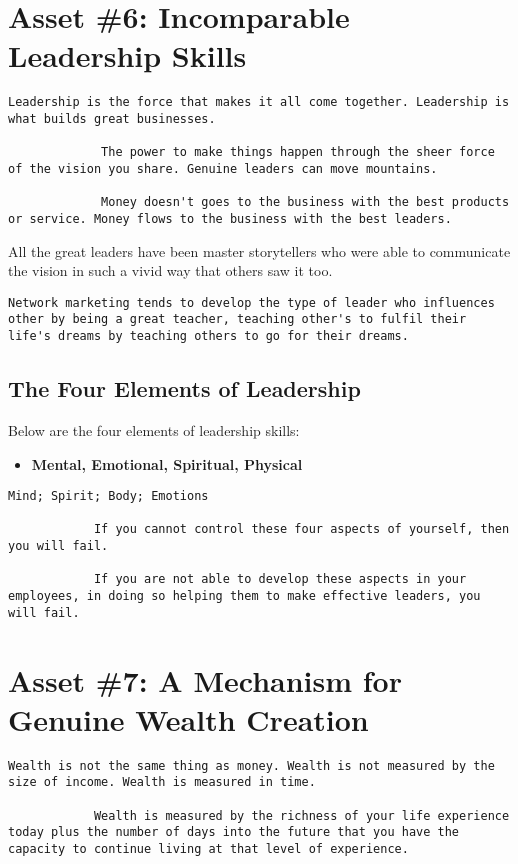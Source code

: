 \documentclass[a4paper, 12pt]{report}
\begin{document}
    \chapter{Asset \#6: Incomparable Leadership Skills}
     \begin{lstlisting}[style=latexFrameTB]
             Leadership is the force that makes it all come together. Leadership is what builds great businesses.
             
             The power to make things happen through the sheer force of the vision you share. Genuine leaders can move mountains.
             
             Money doesn't goes to the business with the best products or service. Money flows to the business with the best leaders.
    \end{lstlisting}
    All the great leaders have been master storytellers who were able to communicate the vision in such a vivid way that others saw it too.
    \begin{lstlisting}[style=latexFrameTB]
             Network marketing tends to develop the type of leader who influences other by being a great teacher, teaching other's to fulfil their life's dreams by teaching others to go for their dreams.
    \end{lstlisting}
    \section{The Four Elements of Leadership}
    Below are the four elements of leadership skills:
    \begin{itemize}
        \item \textbf{Mental, Emotional, Spiritual, Physical} 
       
        
    \end{itemize}
    \begin{lstlisting}[style=latexFrameTB]
            Mind; Spirit; Body; Emotions
            
            If you cannot control these four aspects of yourself, then you will fail.
            
            If you are not able to develop these aspects in your employees, in doing so helping them to make effective leaders, you will fail.
    \end{lstlisting}
    
    
    \chapter{Asset \#7: A Mechanism for Genuine Wealth Creation}
     \begin{lstlisting}[style=latexFrameTB]
            Wealth is not the same thing as money. Wealth is not measured by the size of income. Wealth is measured in time.
            
            Wealth is measured by the richness of your life experience today plus the number of days into the future that you have the capacity to continue living at that level of experience.
    \end{lstlisting}
\end{document}
